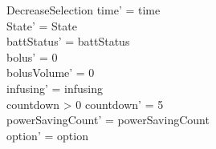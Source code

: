 \begin{schema}{DecreaseSelection}
	time' = time\\ State' = State\\
	\pagebreak
	battStatus' = battStatus\\
	bolus' = 0\\
	bolusVolume' = 0\\
	infusing' = infusing\\
	countdown > 0 \land countdown' = 5\\
	powerSavingCount' = powerSavingCount\\ option' = option\\
\end{schema}

